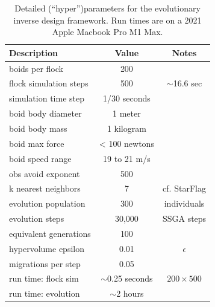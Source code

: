 \documentclass[letterpaper]{article}
\begin{document}

\begin{table}[]
\centering
\begin{tabular}{ | l | c | c | }
    \hline
    \textbf{Description} & \textbf{Value} & \textbf{Notes} \\
    \hline
    boids per flock & 200 &  \\
    flock simulation steps & 500 & $\sim$16.6 sec \\
    simulation time step & 1/30 seconds & \\
    \hline
    boid body diameter & 1 meter & \\
    boid body mass & 1 kilogram & \\
    boid max force & < 100 newtons & \\
    boid speed range & 19 to 21 m/s & \\
    obs avoid exponent & 500 & \\
    k nearest neighbors & 7 & cf. StarFlag \\
    \hline
    evolution population & 300 & individuals \\
    evolution steps & 30,000 &  SSGA steps \\
    equivalent generations & 100 & \\
    hypervolume epsilon & 0.01 & $\epsilon$ \\
    migrations per step & 0.05 &  \\
    \hline
    run time: flock sim & $\sim$0.25 seconds & $200{\times}500$ \\
    run time: evolution & $\sim$2 hours & \\
    \hline
\end{tabular}
\caption{Detailed (``hyper'')parameters for the evolutionary inverse design framework. Run times are on a 2021 Apple Macbook Pro M1 Max.}
\label{table:HyperParameters}
\end{table}



\end{document}
